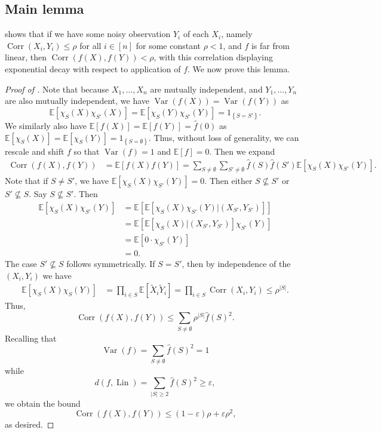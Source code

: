 \documentclass[12pt,letterpaper]{amsart}
\def\E{\mathbb{E}}
\def\Var{\operatorname{Var}}
\def\Corr{\operatorname{Corr}}
\def\Lin{\operatorname{Lin}}
\newcommand{\abs}[1]{\left\lvert#1\right\rvert}
\newcommand{\1}[1]{1_{\left\{#1\right\}}}
\theoremstyle{definition}
\theoremstyle{remark}
\begin{document}
\subsection{Main lemma}
 shows that if we have some noisy observation $Y_i$ of each $X_i$, namely $\Corr(X_i,Y_i)\leq\rho$ for all $i\in[n]$ for some constant $\rho<1$, and $f$ is far from linear, then $\Corr(f(X),f(Y))<\rho$, with this correlation displaying exponential decay with respect to application of $f$.
We now prove this lemma.
\begin{proof}[Proof of ]
    Note that because $X_1,\dots,X_n$ are mutually independent, and $Y_1,\dots,Y_n$ are also mutually independent, we have $\Var(f(X))=\Var(f(Y))$ as 
    \[ \E[\chi_S(X)\chi_{S'}(X)]=\E[\chi_S(Y)\chi_{S'}(Y)]=\1{S=S'}. \]
    We similarly also have $\E[f(X)]=\E[f(Y)]=\widehat f(0)$ as $\E[\chi_S(X)]=\E[\chi_S(Y)]=\1{S=\emptyset}$.
    Thus, without loss of generality, we can rescale and shift $f$ so that $\Var(f)=1$ and $\E[f]=0$.
    Then we expand
    \begin{align*}
        \Corr(f(X),f(Y))
        &= \E[f(X)f(Y)]
        = \sum_{S\neq\emptyset}\sum_{S'\neq\emptyset}\widehat f(S)\widehat f(S')\E[\chi_S(X)\chi_{S'}(Y)].
    \end{align*}
    Note that if $S\neq S'$, we have $\E[\chi_S(X)\chi_{S'}(Y)]=0$.
    Then either $S\not\subseteq S'$ or $S'\not\subseteq S$.
    Say $S\not\subseteq S'$.
    Then
    \begin{align*}
        \E[\chi_S(X)\chi_{S'}(Y)]
        &=\E[\E[\chi_S(X)\chi_{S'}(Y)|(X_{S'},Y_{S'})]]
        \\ &=\E[\E[\chi_S(X)|(X_{S'},Y_{S'})]\chi_{S'}(Y)]
        \\ &=\E[0\cdot\chi_{S'}(Y)]
        \\ &=0.
    \end{align*}
    The case $S'\not\subseteq S$ follows symmetrically.
    If $S=S'$, then by independence of the $(X_i,Y_i)$ we have
    \begin{align*}
        \E[\chi_S(X)\chi_S(Y)]
        &= \prod_{i\in S}\E[\widetilde X_i \widetilde Y_i]
        = \prod_{i\in S}\Corr(X_i,Y_i)
        \leq \rho^{\abs{S}}.
    \end{align*}
    Thus,
    \[ \Corr(f(X),f(Y)) \leq \sum_{S\neq\emptyset}\rho^{\abs{S}}\widehat f(S)^2. \]
    Recalling that
    \[ \Var(f) = \sum_{S\neq\emptyset} \widehat f(S)^2 = 1 \]
    while
    \[ d(f,\Lin)=\sum_{\abs{S}\geq2}\widehat f(S)^2 \geq\varepsilon,\]
    we obtain the bound
    \[ \Corr(f(X),f(Y)) \leq (1-\varepsilon)\rho+\varepsilon\rho^2, \]
    as desired.
\end{proof}
\end{document}
